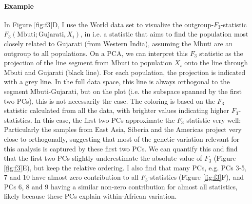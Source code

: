 \documentclass[12pt,fullpage, a4paper]{article}
\begin{document}


\paragraph{Example}
In Figure \ref{fig:f3}D, I use the World data set to visualize the outgroup-$F_3$-statistic $F_3(\text{Mbuti}; \text{Gujarati}, X_i)$, in i.e. a statistic that aims to find the population most closely related to Gujarati (from Western India), assuming the Mbuti are an outgroup to all populations. On a PCA, we can interpret this $F_3$ statistic as the projection of the line segment from $\text{Mbuti}$ to population $X_i$ onto the line through Mbuti and Gujarati (black line). For each population, the projection is indicated with a grey line. In the full data space, this line is always orthogonal to the segment Mbuti-Gujarati, but on the plot (i.e. the subspace spanned by the first two PCs), this is not necessarily the case.  The coloring is based on the $F_3$-statistic calculated from all the data, with brighter values indicating higher $F_3$-statistics. In this case, the first two PCs approximate the $F_3$-statistic very well: Particularly the samples from East Asia, Siberia and the Americas project very close to orthogonally, suggesting that most of the genetic variation relevant for this analysis is captured by these first two PCs.  We can quantify this and find that the first two PCs slightly underestimate the absolute value of $F_3$ (Figure \ref{fig:f3}E), but keep the relative ordering. I also find that many PCs, e.g. PCs 3-5, 7 and 10 have almost zero contribution to all $F_3$-statistics (Figure \ref{fig:f3}F), and PCs 6, 8 and 9 having a similar non-zero contribution for almost all statistics, likely because these PCs explain within-African variation.
\end{document}

